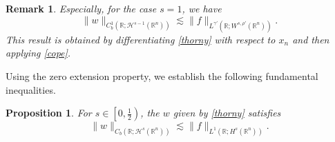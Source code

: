 \documentclass[preprint,compress,12pt]{elsarticle}
\newtheorem{remark}[theorem]{Remark}
\newtheorem{proposition}[theorem]{Proposition}
\numberwithin{equation}{section}
\begin{document}
\begin{remark}
	Especially, for the case $s=1$, we have
	\begin{equation}\label{crisp}
		\|w\|_{C_{b}^{1}(\mathbb{R};\mathcal{H}^{s-1} (\mathbb{R}^{n}) )}\lesssim \|f\|_{L^{\gamma'}(\mathbb{R};W^{s,\rho'}(\mathbb{R}^{n}))}.
	\end{equation}
	This result is obtained by differentiating \eqref{thorny} with respect to $x_{n}$  and then applying \eqref{cope}.
\end{remark}


Using the zero extension property, we establish the following  fundamental inequalities.
\begin{proposition}\label{tardy}
	For $s\in\left[0,\frac{1}{2}\right)$, the $w$ given by \eqref{thorny} satisfies
	\begin{equation}\label{covet}		\|w\|_{C_{b}(\mathbb{R};\mathcal{H}^{s}(\mathbb{R}^{n}))}\lesssim \|f\|_{L^{1}(\mathbb{R};H^{s}(\mathbb{R}^{n}))}.
	\end{equation}
\end{proposition}
\end{document}
